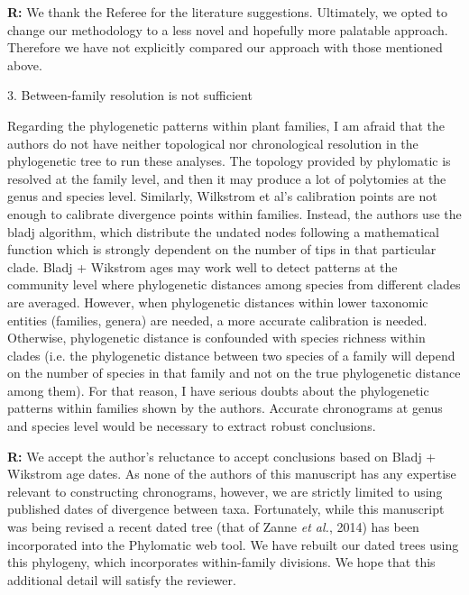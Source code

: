 \documentclass[12pt]{letter}
\newenvironment{refquote}{\bigskip \begin{it}}{\end{it}\smallskip}
\begin{document}
    \textbf{R:} We thank the Referee for the literature suggestions. Ultimately, we opted to change our methodology to a less novel and hopefully more palatable approach. Therefore we have not explicitly compared our approach with those mentioned above.



  3. Between-family resolution is not sufficient

    \begin{refquote}

      Regarding the phylogenetic patterns within plant families, I am afraid that the authors do not have neither topological nor chronological resolution in the phylogenetic tree to run these analyses. The topology provided by phylomatic is resolved at the family level, and then it may produce a lot of polytomies at the genus and species level. Similarly, Wilkstrom et al's calibration points are not enough to calibrate divergence points within families. Instead, the authors use the bladj algorithm, which distribute the undated nodes following a mathematical function which is strongly dependent on the number of tips in that particular clade.  Bladj + Wikstrom ages may work well to detect patterns at the community level where phylogenetic distances among species from different clades are averaged.  However, when phylogenetic distances within lower taxonomic entities (families, genera) are needed, a more accurate calibration is needed. Otherwise, phylogenetic distance is confounded with species richness within clades (i.e. the phylogenetic distance between two species of a family will depend on the  number of species in that family and not on the true phylogenetic distance among them). For that reason, I have serious doubts about the phylogenetic patterns within families shown by the authors. Accurate chronograms at genus and species level would be necessary to extract robust conclusions.

      \end{refquote}

      \textbf{R:} We accept the author's reluctance to accept conclusions based on Bladj + Wikstrom age dates. As none of the authors of this manuscript has any expertise relevant to constructing chronograms, however, we are strictly limited to using published dates of divergence between taxa. Fortunately, while this manuscript was being revised a recent dated tree (that of Zanne \emph{et al.}, 2014) has been incorporated into the Phylomatic web tool. We have rebuilt our dated trees using this phylogeny, which incorporates within-family divisions. We hope that this additional detail will satisfy the reviewer.
\end{document}
